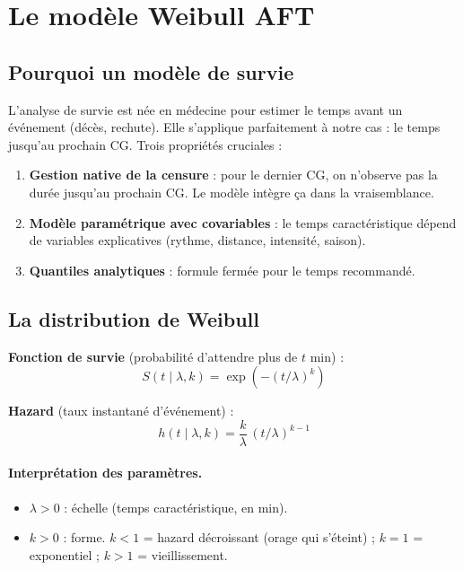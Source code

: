 \documentclass[11pt,a4paper]{article}
\begin{document}
\section{Le modèle Weibull AFT}

\subsection{Pourquoi un modèle de survie}

L'analyse de survie est née en médecine pour estimer le temps avant un événement
(décès, rechute). Elle s'applique parfaitement à notre cas : le temps jusqu'au prochain CG.
Trois propriétés cruciales :
\begin{enumerate}[topsep=2pt]
    \item \textbf{Gestion native de la censure} : pour le dernier CG, on n'observe pas la
    durée jusqu'au prochain CG. Le modèle intègre ça dans la vraisemblance.
    \item \textbf{Modèle paramétrique avec covariables} : le temps caractéristique dépend
    de variables explicatives (rythme, distance, intensité, saison).
    \item \textbf{Quantiles analytiques} : formule fermée pour le temps recommandé.
\end{enumerate}

\subsection{La distribution de Weibull}

\begin{tcolorbox}[colback=blue!5,colframe=blue!50!black,title=\textbf{Distribution de Weibull (paramètres $\lambda, k$)}]
\textbf{Fonction de survie} (probabilité d'attendre plus de $t$ min) :
\[
S(t \mid \lambda, k) = \exp\!\left(-(t/\lambda)^k\right)
\]

\textbf{Hazard} (taux instantané d'événement) :
\[
h(t \mid \lambda, k) = \frac{k}{\lambda}\,(t/\lambda)^{k-1}
\]
\end{tcolorbox}

\paragraph{Interprétation des paramètres.}
\begin{itemize}[topsep=2pt]
    \item $\lambda > 0$ : échelle (temps caractéristique, en min).
    \item $k > 0$ : forme. $k<1$ = hazard décroissant (orage qui s'éteint) ; $k=1$ =
    exponentiel ; $k>1$ = vieillissement.
\end{itemize}
\end{document}
